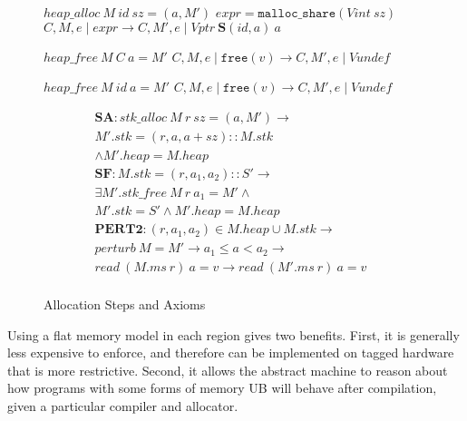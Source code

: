 \documentclass{article}
\begin{document}
\begin{figure}
\begin{minipage}[t]{0.65\textwidth}
                    {\(\mathit{heap\_alloc} ~ M ~ id ~ sz = (a, M')\)}
                    {\(\mathit{expr} = \mathtt{malloc\_share}(\mathit{Vint} ~ sz)\)}
                    {\(C,M,e \mid \mathit{expr} \longrightarrow
                      C,M',e \mid \mathit{Vptr} ~ \mathbf{S}(id,a) ~ a\)}

              {\(\mathit{heap\_free} ~ M ~ C ~ a = M'\)}
              {\(C,M,e \mid \mathtt{free}(v) \longrightarrow
                C,M',e \mid \mathit{Vundef}\)}

             {\(\mathit{heap\_free} ~ M ~ id ~ a = M'\)}
             {\(C,M,e \mid \mathtt{free}(v)  \longrightarrow
               C,M',e \mid \mathit{Vundef}\)}

  \[\begin{split}
    \mathbf{SA} : \mathit{stk\_alloc} ~ M ~ r ~ sz = (a, M') \rightarrow & \\
    M'.stk = (r,a,a+sz)::M.stk & \\
    \land M'.heap = M.heap & \\[0.75em]
    \mathbf{SF} : M.stk = (r,a_1,a_2)::S' \rightarrow & \\
    \exists M' . \mathit{stk\_free} ~ M ~ r ~ a_1 = M' \land & \\
    M'.stk = S' \land M'.heap = M.heap & \\[0.75em]
    \mathbf{PERT2} : (r,a_1,a_2) \in M.heap \cup M.stk \rightarrow & \\
    \mathit{perturb} ~ M = M' \rightarrow
    a_1 \leq a < a_2 \rightarrow & \\
    \mathit{read} ~ (M.ms ~ r) ~ a = v \rightarrow 
    \mathit{read} ~ (M'.ms ~ r) ~ a = v & \\[0.75em]
  \end{split}\]
  \end{minipage}

  \caption{Allocation Steps and Axioms}
  \label{subfig:alstep}
\end{figure}


Using a flat memory model in each region gives two benefits. First, it is generally
less expensive to enforce, and therefore can be implemented on tagged hardware that is more
restrictive. Second, it allows the abstract machine to reason about how programs with some
forms of memory UB will behave after compilation, given a particular compiler and allocator.
\end{document}
